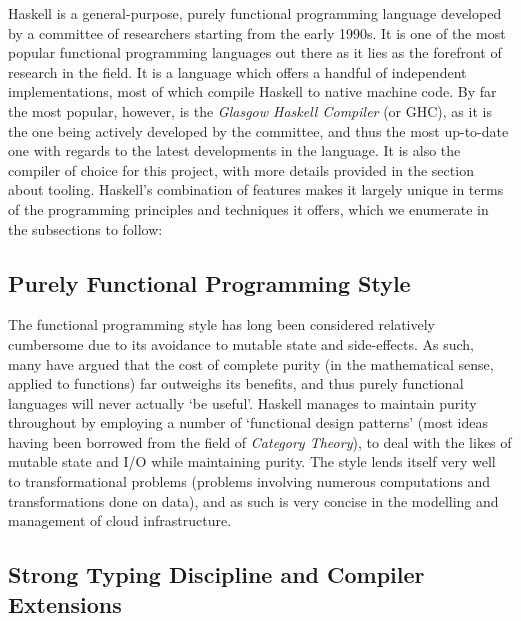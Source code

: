 \documentclass[11pt]{report}
\begin{document}
Haskell is a general-purpose, purely functional programming language developed
by a committee of researchers \cite{realworldhaskell} starting from the early
1990s. It is one of the most popular functional programming languages out there
as it lies as the forefront of research in the field. It is a language which
offers a handful of independent implementations, most of which compile Haskell to
native machine code. By far the most popular, however, is the
\textit{Glasgow Haskell Compiler} (or GHC), as it is the one being actively
developed by the committee, and thus the most up-to-date one with regards to the
latest developments in the language. It is also the compiler of choice for this
project, with more details provided in the section about tooling.
Haskell's combination of features makes it largely unique in terms of the
programming principles and techniques it offers, which we enumerate in the
subsections to follow:

\subsection{Purely Functional Programming Style}

The functional programming style has long been considered relatively cumbersome
due to its avoidance to mutable state and side-effects. As such, many have
argued that the cost of complete purity (in the mathematical sense, applied to
functions) far outweighs its benefits, and thus purely functional languages
will never actually `be useful'. Haskell manages to maintain purity throughout
by employing a number of `functional design patterns' (most ideas having been
borrowed from the field of \textit{Category Theory}), to deal with the likes of
mutable state and I/O while maintaining purity.\newline
The style lends itself very well to transformational problems (problems
involving numerous computations and transformations done on data), and as such
is very concise in the  modelling and management of cloud infrastructure.

\subsection{Strong Typing Discipline and Compiler Extensions}
\end{document}
